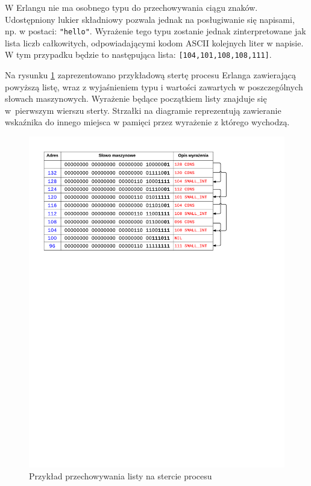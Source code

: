W Erlangu nie ma osobnego typu do przechowywania ciągu znaków. Udostępniony lukier składniowy pozwala jednak na posługiwanie się napisami, np. w postaci: \texttt{"hello"}. Wyrażenie tego typu zostanie jednak zinterpretowane jak lista liczb całkowitych, odpowiadającymi kodom ASCII kolejnych liter w napisie. W tym przypadku będzie to następująca lista: \texttt{[104,101,108,108,111]}.

Na rysunku \ref{fig:listonheap} zaprezentowano przykładową stertę procesu Erlanga zawierającą powyższą listę, wraz z wyjaśnieniem typu i wartości zawartych w poszczególnych słowach maszynowych. 
Wyrażenie będące początkiem listy znajduje się w~pierwszym wierszu sterty.
Strzałki na diagramie reprezentują zawieranie wskaźnika do innego miejsca w pamięci przez wyrażenie z którego wychodzą.

\begin{figure}[h]
\centerline{\includegraphics[scale=1, clip, trim=0 180mm 45mm 0]{list_on_heap}}
\caption{Przykład przechowywania listy na stercie procesu}
\label{fig:listonheap}
\end{figure}

